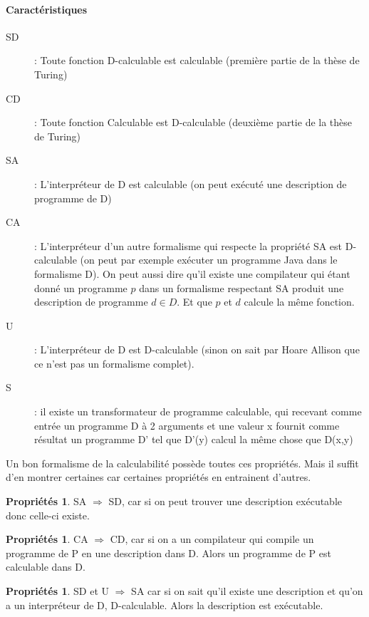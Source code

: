 \documentclass[11pt,a4paper]{article}
\theoremstyle{definition}
\newtheorem{myprop}[mydef]{Propriétés}
\begin{document}
\paragraph{Caractéristiques} 
\begin{description}
	\item[SD] : Toute fonction D-calculable est calculable (première partie 
		de la thèse de Turing)
	\item[CD] : Toute fonction Calculable est D-calculable (deuxième partie 
		de la thèse de Turing)
	\item[SA] : L'interpréteur de D est calculable (on peut exécuté une 
		description de programme de D)
	\item[CA] : L'interpréteur d'un autre formalisme qui respecte la 
		propriété SA est 
		D-calculable (on peut par exemple exécuter un programme Java 
		dans le formalisme D). On peut aussi dire qu'il existe une 
		compilateur qui étant donné un programme $p$ dans un formalisme 
		respectant SA produit une description de programme $d \in D$. 
		Et que $p$ et $d$ calcule la même fonction.
	\item[U] : L'interpréteur de D est D-calculable (sinon on sait par 
		Hoare Allison que ce n'est pas un formalisme complet).
	\item[S] : il existe un transformateur de programme calculable, qui 
		recevant comme entrée un programme D à 2 arguments et une valeur 
		x fournit comme résultat un programme D' tel que D'(y) calcul 
		la même chose que D(x,y)
\end{description}
Un bon formalisme de la calculabilité possède toutes ces propriétés. Mais il 
suffit d'en montrer certaines car certaines propriétés en entrainent d'autres.

\begin{myprop}
	SA $\Rightarrow$ SD, car si on peut trouver une description exécutable 
	donc celle-ci existe.
\end{myprop}

\begin{myprop}
	CA $\Rightarrow$ CD, car si on a un compilateur qui compile un programme 
	de P en une description dans D. Alors un programme de P est calculable dans D.
\end{myprop}

\begin{myprop}
	SD et U $\Rightarrow$ SA car si on sait qu'il existe une description et 
qu'on a un interpréteur de D, D-calculable. Alors la description est exécutable.
\end{myprop}
\end{document}
